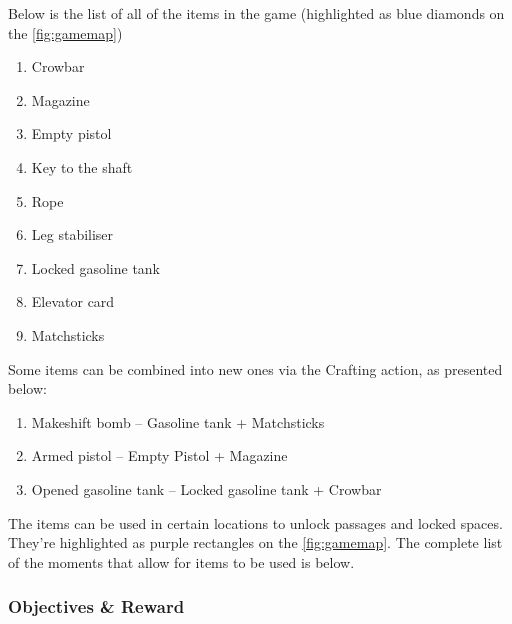 Below is the list of all of the items in the game (highlighted as blue diamonds on the \ref{fig:gamemap})
\begin{enumerate}

    \item Crowbar

    \item Magazine

    \item Empty pistol 

    \item Key to the shaft

    \item Rope 

    \item Leg stabiliser 

    \item Locked gasoline tank 

    \item Elevator card 

    \item Matchsticks 

\end{enumerate}

Some items can be combined into new ones via the Crafting action, as presented below:
\begin{enumerate}

    \item Makeshift bomb -- Gasoline tank + Matchsticks 

    \item Armed pistol -- Empty Pistol + Magazine 

    \item Opened gasoline tank -- Locked gasoline tank + Crowbar

\end{enumerate}





The items can be used in certain locations to unlock passages and locked spaces.
They're highlighted as purple rectangles on the \ref{fig:gamemap}. The complete list of the moments that allow for items to be used is below.





\subsubsection{Objectives \& Reward}



